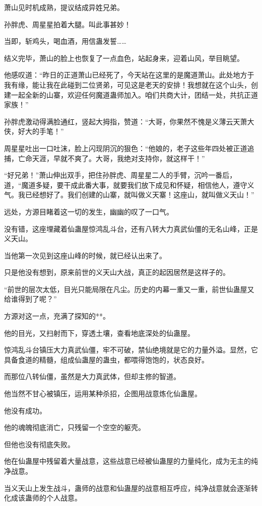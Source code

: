 \begin{this_body}
萧山见时机成熟，提议结成异姓兄弟。

孙胖虎、周星星拍着大腿。叫此事甚妙！

当即，斩鸡头，喝血酒，用信蛊发誓……

结义完毕，萧山的脸上也恢复了一点血色，站起身来，迎着山风，举目眺望。

他感叹道：“昨日的正道萧山已经死了，今天站在这里的是魔道萧山。此处地方于我有缘，能让我在此碰到二位贤弟，可见这是老天的安排！我想就在这个山头，创建一起全新的山寨，欢迎任何魔道蛊师加入。咱们共商大计，团结一处，共抗正道家族！”

孙胖虎激动得满脸通红，竖起大拇指，赞道：“大哥，你果然不愧是义薄云天萧大侠，好大的手笔！”

周星星吐出一口吐沫，脸上闪现阴沉的狠色：“他娘的，老子这些年四处被正道追捕，亡命天涯，早就不爽了。大哥，我绝对支持你，就这样干！”

“好兄弟！”萧山伸出双手，把住孙胖虎、周星星二人的手臂，沉吟一番后，道，“魔道多疑，要干成此番大事，就要我们放下成见和怀疑，相信他人，遵守义气。我已经想好了。我们创建的山寨，就叫做义天寨！这座山，就叫做义天山！”

远处，方源目睹着这一切的发生，幽幽的叹了一口气。

没有错，这座埋藏着仙蛊屋惊鸿乱斗台，还有八转大力真武仙僵的无名山峰，正是义天山。

当他第一次见到这座山峰的时候，就已经认出来了。

只是他没有想到，原来前世的义天山大战，真正的起因居然是这样子的。

“前世的层次太低，目光只能局限在凡尘。历史的内幕一重又一重，前世仙蛊屋又给谁得到了呢？”

方源对这一点，充满了探知的**。

他的目光，又扫射而下，穿透土壤，查看地底深处的仙蛊屋。

惊鸿乱斗台镇压大力真武仙僵，牢不可破，禁仙绝境就是它的力量外溢。显然，它具备食道的精髓，组成仙蛊屋的蛊虫，都喂得饱饱的，状态良好。

而那位八转仙僵，虽然是大力真武体，但却主修的智道。

他当然不甘心被镇压，运用某种杀招，企图用战意炼化仙蛊屋。

他没有成功。

他的魂魄彻底消亡，只残留一个空空的躯壳。

但他也没有彻底失败。

他在仙蛊屋中残留着大量战意，这些战意已经被仙蛊屋的力量纯化，成为无主的纯净战意。

当义天山上发生战斗，蛊师的战意和仙蛊屋的战意相互呼应，纯净战意就会逐渐转化成该蛊师的个人战意。


\end{this_body}
